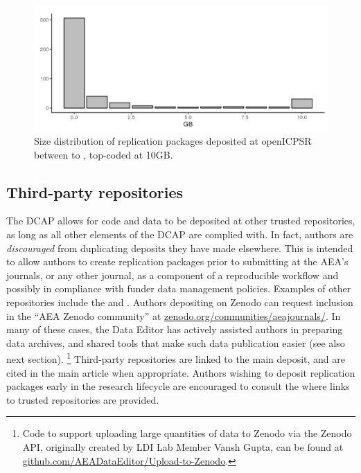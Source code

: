 \begin{figure}[t]
    \centering
    \includegraphics[width=\textwidth]{images/plot_filesize_dist.png} 
    \caption{Size distribution of replication packages deposited at openICPSR between  \firstday{} to \lastday{}, top-coded at 10GB.}
    \label{fig:size_packages}
\end{figure}


\subsection{Third-party repositories}

The \ac{DCAP} allows for code and data  to be deposited at other trusted repositories, as long as all other elements of the \ac{DCAP} are complied with. In fact, authors are \textit{discouraged} from duplicating deposits they have made elsewhere. This is intended to allow authors to create replication packages prior to submitting at the AEA's journals, or any other journal, as a component of a reproducible workflow and possibly in compliance with funder data management policies. Examples of other repositories include the  and . Authors depositing on Zenodo can request inclusion in the ``AEA Zenodo community'' at \href{https://zenodo.org/communities/aeajournals/}{zenodo.org/communities/aeajournals/}. In many of these cases, the Data Editor has actively assisted authors in preparing  data archives, and shared tools that make such data publication easier (see also next section).%
\footnote{Code to support uploading large quantities of data to Zenodo via the Zenodo API, originally created by LDI Lab Member Vansh Gupta, can be found at \href{https://github.com/AEADataEditor/Upload-to-Zenodo}{github.com/AEADataEditor/Upload-to-Zenodo}.}  Third-party repositories are linked to the main \aeadcr{} deposit, and are cited in the main article when appropriate. Authors wishing to deposit replication packages early in the research lifecycle are encouraged to consult the  where links to trusted repositories are provided.  
